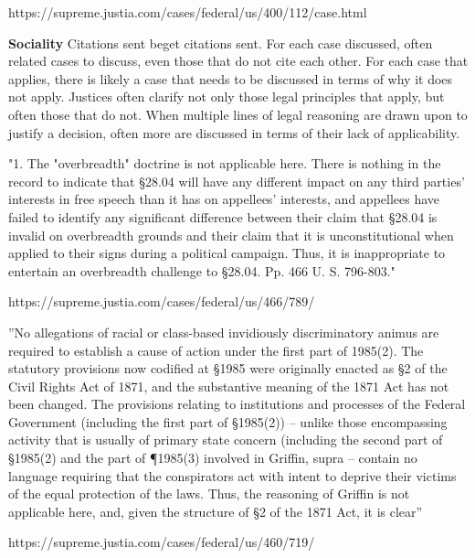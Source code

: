 \documentclass[headsepline=true, abstracton]{scrartcl}
\begin{document}
https://supreme.justia.com/cases/federal/us/400/112/case.html

\textbf{Sociality} Citations sent beget citations sent.  For each case discussed, often related cases to discuss, even those that do not cite each other. For each case that applies, there is likely a case that needs to be discussed in terms of why it does not apply. Justices often clarify not only those legal principles that apply, but often those that do not. When multiple lines of legal reasoning are drawn upon to justify a decision, often more are discussed in terms of their lack of applicability. 

"1. The "overbreadth" doctrine is not applicable here. There is nothing in the record to indicate that \S 28.04 will have any different impact on any third parties' interests in free speech than it has on appellees' interests, and appellees have failed to identify any significant difference between their claim that \S 28.04 is invalid on overbreadth grounds and their claim that it is unconstitutional when applied to their signs during a political campaign. Thus, it is inappropriate to entertain an overbreadth challenge to \S 28.04. Pp. 466 U. S. 796-803."

https://supreme.justia.com/cases/federal/us/466/789/

''No allegations of racial or class-based invidiously discriminatory animus are required to establish a cause of action under the first part of  1985(2). The statutory provisions now codified at \S 1985 were originally enacted as \S 2 of the Civil Rights Act of 1871, and the substantive meaning of the 1871 Act has not been changed. The provisions relating to institutions and processes of the Federal Government (including the first part of \S 1985(2)) -- unlike those encompassing activity that is usually of primary state concern (including the second part of \S 1985(2) and the part of \P 1985(3) involved in Griffin, supra -- contain no language requiring that the conspirators act with intent to deprive their victims of the equal protection of the laws. Thus, the reasoning of Griffin is not applicable here, and, given the structure of \S 2 of the 1871 Act, it is clear''

https://supreme.justia.com/cases/federal/us/460/719/


 
\end{document}
